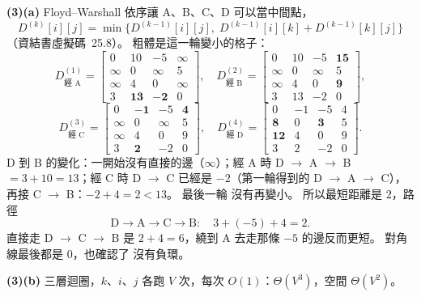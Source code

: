 \begin{pastsoln}
\textbf{(3)(a)} Floyd--Warshall 依序讓 A、B、C、D 可以當中間點，
\[
D^{(k)}[i][j] = \min\bigl\{D^{(k-1)}[i][j],\; D^{(k-1)}[i][k] + D^{(k-1)}[k][j]\bigr\}
\]
（資結書虛擬碼~25.8）。 粗體是這一輪變小的格子：
\[
D^{(1)}_{\text{經 A}} = \begin{bmatrix}
0 & 10 & -5 & \infty \\
\infty & 0 & \infty & 5 \\
\infty & 4 & 0 & \infty \\
3 & \mathbf{13} & \mathbf{-2} & 0
\end{bmatrix}\!,\quad
D^{(2)}_{\text{經 B}} = \begin{bmatrix}
0 & 10 & -5 & \mathbf{15} \\
\infty & 0 & \infty & 5 \\
\infty & 4 & 0 & \mathbf{9} \\
3 & 13 & -2 & 0
\end{bmatrix}\!,
\]
\[
D^{(3)}_{\text{經 C}} = \begin{bmatrix}
0 & \mathbf{-1} & -5 & \mathbf{4} \\
\infty & 0 & \infty & 5 \\
\infty & 4 & 0 & 9 \\
3 & \mathbf{2} & -2 & 0
\end{bmatrix}\!,\quad
D^{(4)}_{\text{經 D}} = \begin{bmatrix}
0 & -1 & -5 & 4 \\
\mathbf{8} & 0 & \mathbf{3} & 5 \\
\mathbf{12} & 4 & 0 & 9 \\
3 & 2 & -2 & 0
\end{bmatrix}\!.
\]
D 到 B 的變化：一開始沒有直接的邊（$\infty$）；經 A 時 D $\to$ A $\to$ B $= 3 + 10 = 13$；經 C 時
D $\to$ C 已經是 $-2$（第一輪得到的 D $\to$ A $\to$ C），再接 C $\to$ B：$-2 + 4 = 2 < 13$。 最後一輪
沒有再變小。 所以最短距離是 $2$，路徑
\[
\text{D} \to \text{A} \to \text{C} \to \text{B}: \quad 3 + (-5) + 4 = 2 .
\]
直接走 D $\to$ C $\to$ B 是 $2 + 4 = 6$，繞到 A 去走那條 $-5$ 的邊反而更短。 對角線最後都是 $0$，也確認了
沒有負環。

\textbf{(3)(b)} 三層迴圈，$k$、$i$、$j$ 各跑 $V$ 次，每次 $O(1)$：$\Theta(V^3)$，空間 $\Theta(V^2)$。
\end{pastsoln}
